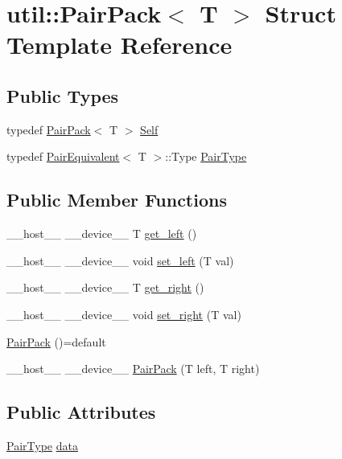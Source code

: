 \hypertarget{structutil_1_1PairPack}{\section{util\-:\-:Pair\-Pack$<$ T $>$ Struct Template Reference}
\label{structutil_1_1PairPack}
}
\subsection*{Public Types}
\begin{DoxyCompactItemize}
\item 
typedef \hyperlink{structutil_1_1PairPack}{Pair\-Pack}$<$ T $>$ \hyperlink{structutil_1_1PairPack_aa2dfda083e6b23cdf79a5a3fe31da966}{Self}
\item 
typedef \hyperlink{structutil_1_1PairEquivalent}{Pair\-Equivalent}$<$ T $>$\-::Type \hyperlink{structutil_1_1PairPack_ad8f183acaed77988695003ec85c202c5}{Pair\-Type}
\end{DoxyCompactItemize}
\subsection*{Public Member Functions}
\begin{DoxyCompactItemize}
\item 
\-\_\-\-\_\-host\-\_\-\-\_\- \-\_\-\-\_\-device\-\_\-\-\_\- T \hyperlink{structutil_1_1PairPack_a980e9f6179abcb01663f035a26752ada}{get\-\_\-left} ()
\item 
\-\_\-\-\_\-host\-\_\-\-\_\- \-\_\-\-\_\-device\-\_\-\-\_\- void \hyperlink{structutil_1_1PairPack_a568060648054d461de6ba665c27a07d2}{set\-\_\-left} (T val)
\item 
\-\_\-\-\_\-host\-\_\-\-\_\- \-\_\-\-\_\-device\-\_\-\-\_\- T \hyperlink{structutil_1_1PairPack_a3500dfc049410ebb91932ba081c396dd}{get\-\_\-right} ()
\item 
\-\_\-\-\_\-host\-\_\-\-\_\- \-\_\-\-\_\-device\-\_\-\-\_\- void \hyperlink{structutil_1_1PairPack_a6d74f3696661394291ad12cb23a5e9f9}{set\-\_\-right} (T val)
\item 
\hyperlink{structutil_1_1PairPack_acae0e3609ba69230400637fa0cda8beb}{Pair\-Pack} ()=default
\item 
\-\_\-\-\_\-host\-\_\-\-\_\- \-\_\-\-\_\-device\-\_\-\-\_\- \hyperlink{structutil_1_1PairPack_a7d75fac7dc3ccca6198387ce5b6bfc0b}{Pair\-Pack} (T left, T right)
\end{DoxyCompactItemize}
\subsection*{Public Attributes}
\begin{DoxyCompactItemize}
\item 
\hyperlink{structutil_1_1PairPack_ad8f183acaed77988695003ec85c202c5}{Pair\-Type} \hyperlink{structutil_1_1PairPack_aec1cdcd3f1e2925b16cc352740e0062d}{data}
\end{DoxyCompactItemize}
